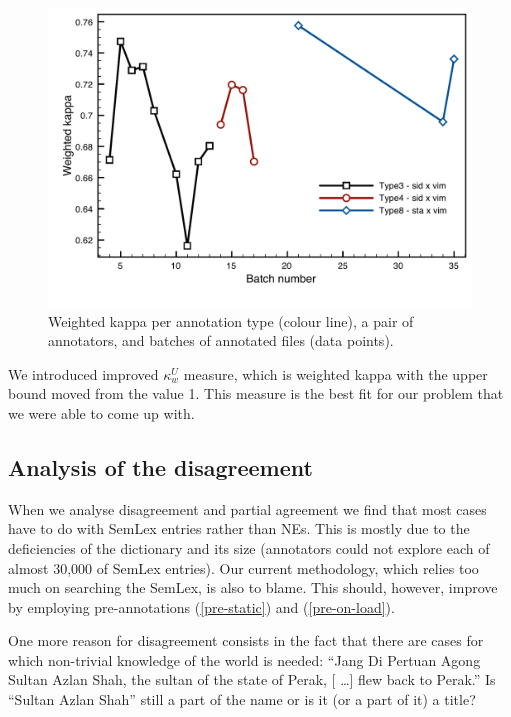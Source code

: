 \begin{figure}[htbp]
   \centering
   \includegraphics[width=\textwidth]{images/kappa.pdf}
   \caption{Weighted kappa per annotation type (colour line), a pair of annotators, and batches of annotated files (data points).}
   \label{fig:kappa}
\end{figure}


We introduced improved $\kappa_w^U$ measure, which is weighted kappa with the upper bound moved from the value 1. This measure is the best fit for our problem that we were able to come up with. 

\subsection{Analysis of the disagreement}
When we analyse disagreement and partial agreement we find that most cases have to do with SemLex entries rather than NEs. This is mostly due to the deficiencies of the dictionary and its size (annotators could not explore each of almost 30,000 of SemLex entries). Our current methodology, which relies too much on searching the SemLex, is also to blame. This should, however, improve by employing pre-annotations (\ref{pre-static}) and (\ref{pre-on-load}). 

One more reason for disagreement consists in the fact that there are cases for which non-trivial knowledge of the world is needed: ``Jang Di Pertuan Agong Sultan Azlan Shah, the sultan of the state of Perak, [\kern 2pt \ldots] flew back to Perak.'' Is ``Sultan Azlan Shah'' still a part of the name or is it (or a part of it) a title?

